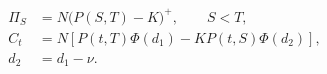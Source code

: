 \documentclass{equation-sheet}
\begin{document}
\begin{equation*}
\begin{aligned}
\Pi_S &= N\bigl(P(S,T)-K\bigr)^+, \qquad S<T, \\[0.75em]
C_t
  &= N\left[P(t,T)\Phi(d_1)
     -K P(t,S)\Phi(d_2)\right], \\[0.55em]
d_2 &= d_1-\nu.
\end{aligned}
\end{equation*}
\end{document}
